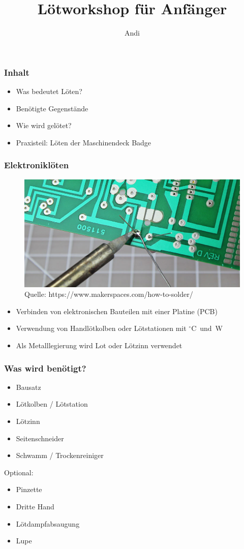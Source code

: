 \documentclass[10pt]{beamer}
\title[soldering-workshop] %
{Lötworkshop für Anfänger}
\author{Andi}
\begin{document}
    \maketitle
    
    
    \begin{frame}
    \frametitle{Inhalt}
    \begin{itemize}
    	\item{Was bedeutet Löten?}
    	\item{Benötigte Gegenstände}
    	\item{Wie wird gelötet?}
    	\item{Praxisteil: Löten der Maschinendeck Badge}
    \end{itemize}
	\end{frame}

	\begin{frame}
	\frametitle{Elektroniklöten}
	\begin{figure}[hbtp]
		\centering
		\includegraphics[width=\linewidth*2/3]{images/elektronikloeten.jpg}
		\caption{Quelle: https://www.makerspaces.com/how-to-solder/}
	\end{figure}
	\begin{itemize}
		\item{Verbinden von elektronischen Bauteilen mit einer Platine (PCB)}
		\item{Verwendung von Handlötkolben oder Lötstationen mit \unit[300 - 450]{$^\circ$C} und \unit[30 - 100]{W}}
		\item{Als Metalllegierung wird Lot oder Lötzinn verwendet}
	\end{itemize}
	\end{frame}

	\begin{frame}
		\frametitle{Was wird benötigt?}
		\begin{itemize}
			\item{Bausatz}
			\item{Lötkolben / Lötstation}
			\item{Lötzinn}
			\item{Seitenschneider}
			\item{Schwamm / Trockenreiniger}
		\end{itemize}
		Optional:
		\begin{itemize}
			\item{Pinzette}
			\item{Dritte Hand}
			\item{Lötdampfabsaugung}
			\item{Lupe}	
		\end{itemize}
	\end{frame}
\end{document}
